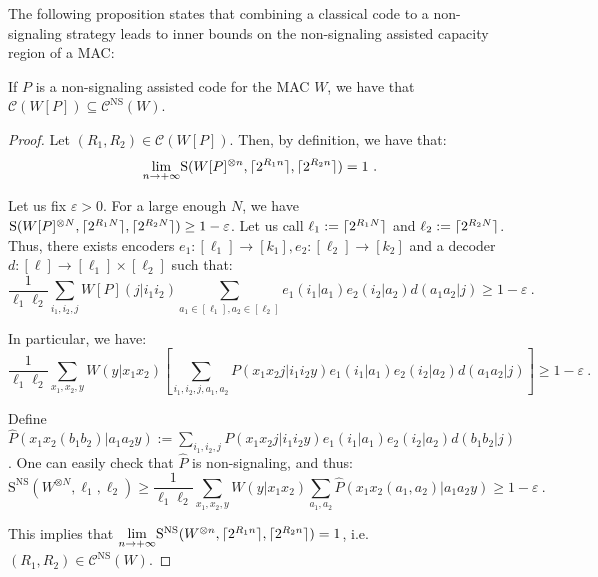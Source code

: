   The following proposition states that combining a classical code to a non-signaling strategy leads to inner bounds on the non-signaling assisted capacity region of a MAC:
  
  \begin{proposition}
    \label{prop:concatCodes}
    If $P$ is a non-signaling assisted code for the MAC $W$, we have that $\mathcal{C}(W[P]) \subseteq \mathcal{C}^{\mathrm{NS}}(W)$.
  \end{proposition}

  \begin{proof}
    Let $(R_1,R_2) \in \mathcal{C}(W[P])$. Then, by definition, we have that:
    \[ \underset{n \rightarrow +\infty}{\lim} \mathrm{S}(W[P]^{\otimes n},\ceil{2^{R_1n}},\ceil{2^{R_2n}}) = 1 \ . \]

    Let us fix $\varepsilon > 0$. For a large enough $N$, we have $\mathrm{S}(W[P]^{\otimes N},\lceil2^{R_1N}\rceil,\lceil2^{R_2N}\rceil) \geq 1 - \varepsilon$. Let us call $\ell_1 := \lceil2^{R_1N}\rceil$ and $\ell_2 := \lceil2^{R_2N}\rceil$. Thus, there exists encoders $e_1:[\ell_1] \rightarrow [k_1],e_2:[\ell_2] \rightarrow [k_2]$ and a decoder $d:[\ell] \rightarrow [\ell_1] \times [\ell_2]$ such that:
    \[ \frac{1}{\ell_1\ell_2} \sum_{i_1,i_2,j} W[P](j|i_1i_2)\sum_{a_1 \in [\ell_1],a_2 \in [\ell_2]}e_1(i_1|a_1)e_2(i_2|a_2)d(a_1a_2|j) \geq 1 - \varepsilon \ . \]

    In particular, we have:
    \[ \frac{1}{\ell_1\ell_2} \sum_{x_1,x_2,y} W(y|x_1x_2) \left[\sum_{i_1,i_2,j,a_1,a_2}P(x_1x_2j|i_1i_2y)e_1(i_1|a_1)e_2(i_2|a_2)d(a_1a_2|j)\right] \geq 1 - \varepsilon \ . \]


    Define $\hat{P}(x_1x_2(b_1b_2)|a_1a_2y) := \sum_{i_1,i_2,j}P(x_1x_2j|i_1i_2y)e_1(i_1|a_1)e_2(i_2|a_2)d(b_1b_2|j)$. One can easily check that $\hat{P}$ is non-signaling, and thus:
    \[ \mathrm{S}^{\mathrm{NS}}(W^{\otimes N},\ell_1,\ell_2) \geq \frac{1}{\ell_1\ell_2} \sum_{x_1,x_2,y} W(y|x_1x_2)\sum_{a_1,a_2}\hat{P}(x_1x_2(a_1,a_2)|a_1a_2y) \geq 1 - \varepsilon \ .  \]

    This implies that $\underset{n \rightarrow +\infty}{\lim} \mathrm{S}^{\mathrm{NS}}(W^{\otimes n},\lceil2^{R_1n}\rceil,\lceil2^{R_2n}\rceil) = 1$, i.e. $(R_1,R_2) \in \mathcal{C}^{\mathrm{NS}}(W)$.
  \end{proof}

